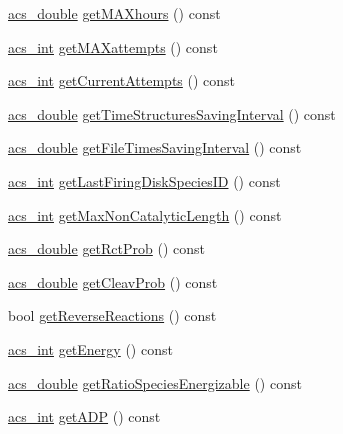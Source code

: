 \begin{DoxyCompactItemize}
\item 
\hyperlink{a00050_ab776853a005fcbf56af0424a2a4dd607}{acs\-\_\-double} \hyperlink{a00014_af2b482132fc3ab299118f7a894bd53a2}{get\-M\-A\-Xhours} () const 
\item 
\hyperlink{a00050_a8d277355641a098190360234e2ebde35}{acs\-\_\-int} \hyperlink{a00014_ae626b961a53eeb5e08b4190da235e8dd}{get\-M\-A\-Xattempts} () const 
\item 
\hyperlink{a00050_a8d277355641a098190360234e2ebde35}{acs\-\_\-int} \hyperlink{a00014_a0851e3481e6fec7f4feef126d5a6704c}{get\-Current\-Attempts} () const 
\item 
\hyperlink{a00050_ab776853a005fcbf56af0424a2a4dd607}{acs\-\_\-double} \hyperlink{a00014_a892dd7bd29342c4206c39556d91a83da}{get\-Time\-Structures\-Saving\-Interval} () const 
\item 
\hyperlink{a00050_ab776853a005fcbf56af0424a2a4dd607}{acs\-\_\-double} \hyperlink{a00014_a77e995bee54ab4e09f165a857a7b0272}{get\-File\-Times\-Saving\-Interval} () const 
\item 
\hyperlink{a00050_a8d277355641a098190360234e2ebde35}{acs\-\_\-int} \hyperlink{a00014_a984f79e5f89b774b65db901899687ac0}{get\-Last\-Firing\-Disk\-Species\-I\-D} () const 
\item 
\hyperlink{a00050_a8d277355641a098190360234e2ebde35}{acs\-\_\-int} \hyperlink{a00014_aca760caf9354f541020c1db58490b18f}{get\-Max\-Non\-Catalytic\-Length} () const 
\item 
\hyperlink{a00050_ab776853a005fcbf56af0424a2a4dd607}{acs\-\_\-double} \hyperlink{a00014_ae244aa972cf10c103b8b20d95703831f}{get\-Rct\-Prob} () const 
\item 
\hyperlink{a00050_ab776853a005fcbf56af0424a2a4dd607}{acs\-\_\-double} \hyperlink{a00014_ac728f6ab012c42fa85a2e2f70df7dc58}{get\-Cleav\-Prob} () const 
\item 
bool \hyperlink{a00014_a2a2ac2a8140df67688a71d3349adf04a}{get\-Reverse\-Reactions} () const 
\item 
\hyperlink{a00050_a8d277355641a098190360234e2ebde35}{acs\-\_\-int} \hyperlink{a00014_ab463a460de102c79c1044ab8a2c176ae}{get\-Energy} () const 
\item 
\hyperlink{a00050_ab776853a005fcbf56af0424a2a4dd607}{acs\-\_\-double} \hyperlink{a00014_a4fcc6030b68a37bedff870b9c48c188d}{get\-Ratio\-Species\-Energizable} () const 
\item 
\hyperlink{a00050_a8d277355641a098190360234e2ebde35}{acs\-\_\-int} \hyperlink{a00014_a69d18914fe7c8e96b10992668960b83b}{get\-A\-D\-P} () const 
\item 

\end{DoxyCompactItemize}
